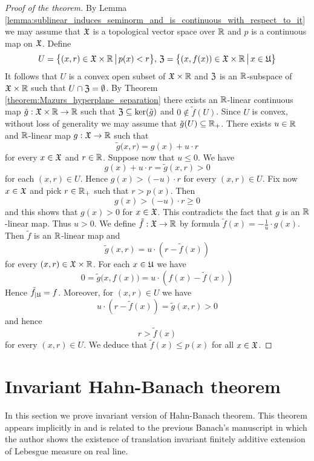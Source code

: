 \begin{proof}[Proof of the theorem]
By Lemma \ref{lemma:sublinear_induces_seminorm_and_is_continuous_with_respect_to_it} we may assume that ${\mathfrak X}$ is a topological vector space over ${\mathbb R}$ and $p$ is a continuous map on ${\mathfrak X}$. Define
$$U = \big\{(x,r)\in {\mathfrak X}\times {\mathbb R}\,\big|\,p(x) < r\big\},\,{\mathfrak Z} = \big\{(x,f(x))\in {\mathfrak X}\times {\mathbb R}\,\big|\,x\in {\mathfrak U}\big\}$$ 
It follows that $U$ is a convex open subset of ${\mathfrak X}\times {\mathbb R}$ and ${\mathfrak Z}$ is an ${\mathbb R}$-subspace of ${\mathfrak X}\times {\mathbb R}$ such that $U \cap {\mathfrak Z} = \emptyset$. By Theorem \ref{theorem:Mazurs_hyperplane_separation} there exists an ${\mathbb R}$-linear continuous map $\tilde{g}:{\mathfrak X}\times {\mathbb R}\rightarrow {\mathbb R}$ such that ${\mathfrak Z}\subseteq \ker(\tilde{g})$ and $0 \not \in \tilde{f}(U)$. Since $U$ is convex, without loss of generality we may assume that $\tilde{g}(U)\subseteq {\mathbb R}_+$. There exists $u \in {\mathbb R}$ and ${\mathbb R}$-linear map $g:{\mathfrak X}\rightarrow {\mathbb R}$ such that 
$$\tilde{g}\big(x, r\big) = g(x) + u\cdot r$$
for every $x \in {\mathfrak X}$ and $r \in {\mathbb R}$. Suppose now that $u \leq 0$. We have
$$g(x) + u\cdot r = \tilde{g}(x,r) > 0$$
for each $(x,r) \in U$. Hence $g(x) > (- u) \cdot r$ for every $(x,r) \in U$. Fix now $x\in {\mathfrak X}$ and pick $r \in {\mathbb R}_+$ such that $r > p(x)$. Then 
$$g(x) > (-u)\cdot r \geq 0$$ 
and this shows that $g(x) > 0$ for $x\in {\mathfrak X}$. This contradicts the fact that $g$ is an ${\mathbb R}$-linear map. Thus $u > 0$. We define $\tilde{f}:{\mathfrak X}\rightarrow {\mathbb R}$ by formula $\tilde{f}(x) = -\frac{1}{u}\cdot g(x)$. Then $\tilde{f}$ is an ${\mathbb R}$-linear map and $$\tilde{g}(x, r) = u \cdot \left(r - \tilde{f}(x)\right)$$
for every $(x,r) \in {\mathfrak X}\times {\mathbb R}$. For each $x \in {\mathfrak U}$ we have
$$0 = \tilde{g}\big(x,f(x)\big) = u \cdot \left(f(x) - \tilde{f}(x)\right)$$
Hence $\tilde{f}_{\mid {\mathfrak U}} = f$. Moreover, for $(x,r) \in U$ we have 
$$u\cdot \left(r - \tilde{f}(x)\right) = \tilde{g}(x, r) > 0$$
and hence
$$r > \tilde{f}(x)$$
for every $(x,r)\in U$. We deduce that $\tilde{f}(x) \leq p(x)$ for all $x\in {\mathfrak X}$. 
\end{proof}


\section{Invariant Hahn-Banach theorem}
\noindent
In this section we prove invariant version of Hahn-Banach theorem. This theorem appears implicitly in \cite[Chapitre II, \S3]{banach1979theorieoperationslineaires} and is related to the previous Banach's manuscript \cite{banach1923problemelameasure} in which the author shows the existence of translation invariant finitely additive extension of Lebesgue measure on real line.

